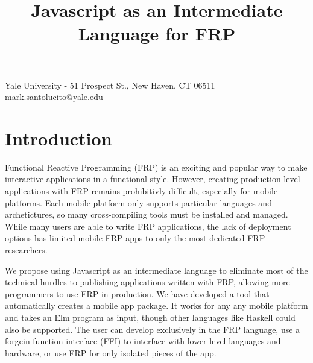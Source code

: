 \documentclass[preprint]{sigplanconf}
\begin{document}
\setlength{\pdfpageheight}{\paperheight}
\setlength{\pdfpagewidth}{\paperwidth}






\title{Javascript as an Intermediate Language for FRP}

           {Yale University - 51 Prospect St., New Haven, CT 06511}
           {mark.santolucito@yale.edu}

\maketitle

\section{Introduction}

Functional Reactive Programming (FRP) is an exciting and popular way to make interactive applications in a functional style.
However, creating production level applications with FRP remains prohibitivly difficult, especially for mobile platforms.
Each mobile platform only supports particular languages and archetictures, so many cross-compiling tools must be installed and managed.
While many users are able to write FRP applications, the lack of deployment options has limited mobile FRP apps to only the most dedicated FRP researchers.

We propose using Javascript as an intermediate language to eliminate most of the technical hurdles to publishing applications written with FRP, allowing more programmers to use FRP in production.
We have developed a tool that automatically creates a mobile app package.
It works for any any mobile platform and takes an Elm program as input, though other languages like Haskell could also be supported.
The user can develop exclusively in the FRP language, use a forgein function interface (FFI) to interface with lower level languages and hardware, or use FRP for only isolated pieces of the app.
\end{document}
